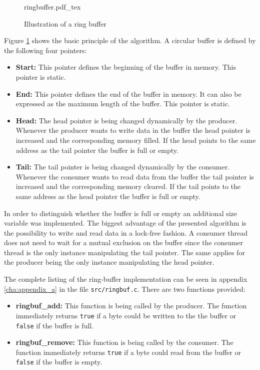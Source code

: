 \begin{figure}[H]
\centering
{ringbuffer.pdf_tex}
\caption{Illustration of a ring buffer}
\label{fig:ringbuffer}
\end{figure}

Figure \ref{fig:ringbuffer} shows the basic principle of the algorithm. A circular buffer is defined by the following four pointers:

\begin{itemize}
    \item \textbf{Start:} This pointer defines the beginning of the buffer in memory. This pointer is static.
    \item \textbf{End:} This pointer defines the end of the buffer in memory. It can also be expressed as the maximum length of the buffer. This pointer is static.
    \item \textbf{Head:} The head pointer is being changed dynamically by the producer. Whenever the producer wants to write data in the buffer the head pointer is increased and the corresponding memory filled. If the head points to the same address as the tail pointer the buffer is full or empty.
    \item \textbf{Tail:} The tail pointer is being changed dynamically by the consumer. Whenever the consumer wants to read data from the buffer the tail pointer is increased and the corresponding memory cleared. If the tail points to the same address as the head pointer the buffer is full or empty.
\end{itemize}

In order to distinguish whether the buffer is full or empty an additional size variable was implemented. The biggest advantage of the presented algorithm is the possibility to write and read data in a lock-free fashion. A consumer thread does not need to wait for a mutual exclusion on the buffer since the consumer thread is the only instance manipulating the tail pointer. The same applies for the producer being the only instance manipulating the head pointer.

The complete listing of the ring-buffer implementation can be seen in appendix \ref{cha:appendix_a} in the file \texttt{src/ringbuf.c}. There are two functions provided:

\begin{itemize}
    \item \textbf{ringbuf\_add:} This function is being called by the producer. The function immediately returns \texttt{true} if a byte could be written to the the buffer or \texttt{false} if the buffer is full.
    \item \textbf{ringbuf\_remove:} This function is being called by the consumer. The function immediately returns \texttt{true} if a byte could read from the buffer or \texttt{false} if the buffer is empty.
\end{itemize}

